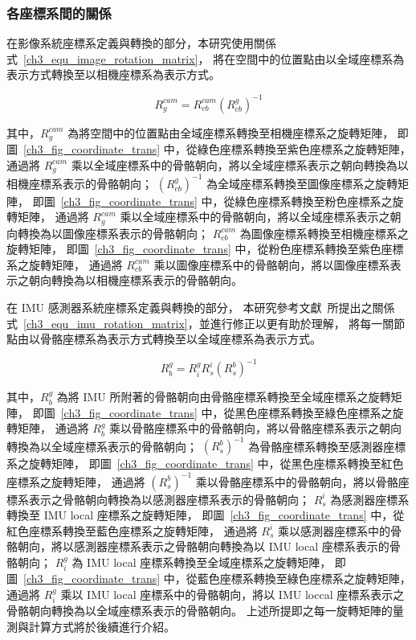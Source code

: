 \subsubsection{各座標系間的關係}
在影像系統座標系定義與轉換的部分，本研究使用關係式~\ref{ch3_equ_image_rotation_matrix}，
將在空間中的位置點由以全域座標系為表示方式轉換至以相機座標系為表示方式。

\begin{equation}
   R^{cam}_{g} = R^{cam}_{cb}(R^{g}_{cb})^{-1}
   \label{ch3_equ_image_rotation_matrix}
\end{equation}

其中，$R^{cam}_g$ 為將空間中的位置點由全域座標系轉換至相機座標系之旋轉矩陣，
即圖~\ref{ch3_fig_coordinate_trans} 中，從綠色座標系轉換至紫色座標系之旋轉矩陣，
通過將 $R^{cam}_g$ 乘以全域座標系中的骨骼朝向，將以全域座標系表示之朝向轉換為以相機座標系表示的骨骼朝向；
$(R^{g}_{cb})^{-1}$ 為全域座標系轉換至圖像座標系之旋轉矩陣，
即圖~\ref{ch3_fig_coordinate_trans} 中，從綠色座標系轉換至粉色座標系之旋轉矩陣，
通過將 $R^{cam}_g$ 乘以全域座標系中的骨骼朝向，將以全域座標系表示之朝向轉換為以圖像座標系表示的骨骼朝向；
$R^{cam}_{cb}$ 為圖像座標系轉換至相機座標系之旋轉矩陣，
即圖~\ref{ch3_fig_coordinate_trans} 中，從粉色座標系轉換至紫色座標系之旋轉矩陣，
通過將 $R^{cam}_{cb}$ 乘以圖像座標系中的骨骼朝向，將以圖像座標系表示之朝向轉換為以相機座標系表示的骨骼朝向。

在 IMU 感測器系統座標系定義與轉換的部分，
本研究參考文獻~\cite{malleson2017real}所提出之關係式~\ref{ch3_equ_imu_rotation_matrix}，並進行修正以更有助於理解，
將每一關節點由以骨骼座標系為表示方式轉換至以全域座標系為表示方式。

\begin{equation}
   R^g_b=R^g_iR^i_s(R^b_s)^{-1}
   \label{ch3_equ_imu_rotation_matrix}
\end{equation}

其中，$R^g_b$ 為將 IMU 所附著的骨骼朝向由骨骼座標系轉換至全域座標系之旋轉矩陣，
即圖~\ref{ch3_fig_coordinate_trans} 中，從黑色座標系轉換至綠色座標系之旋轉矩陣，
通過將 $R^g_b$ 乘以骨骼座標系中的骨骼朝向，將以骨骼座標系表示之朝向轉換為以全域座標系表示的骨骼朝向；
$(R^b_s)^{-1}$ 為骨骼座標系轉換至感測器座標系之旋轉矩陣，
即圖~\ref{ch3_fig_coordinate_trans} 中，從黑色座標系轉換至紅色座標系之旋轉矩陣，
通過將 $(R^b_s)^{-1}$ 乘以骨骼座標系中的骨骼朝向，將以骨骼座標系表示之骨骼朝向轉換為以感測器座標系表示的骨骼朝向；
$R^i_s$ 為感測器座標系轉換至 IMU local 座標系之旋轉矩陣，
即圖~\ref{ch3_fig_coordinate_trans} 中，從紅色座標系轉換至藍色座標系之旋轉矩陣，
通過將 $R^i_s$ 乘以感測器座標系中的骨骼朝向，將以感測器座標系表示之骨骼朝向轉換為以 IMU local 座標系表示的骨骼朝向；
$R^g_i$ 為 IMU local 座標系轉換至全域座標系之旋轉矩陣，
即圖~\ref{ch3_fig_coordinate_trans} 中，從藍色座標系轉換至綠色座標系之旋轉矩陣，
通過將 $R^g_i$ 乘以 IMU local 座標系中的骨骼朝向，將以 IMU loccal 座標系表示之骨骼朝向轉換為以全域座標系表示的骨骼朝向。
上述所提即之每一旋轉矩陣的量測與計算方式將於後續進行介紹。

